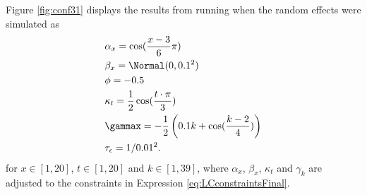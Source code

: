 Figure \ref{fig:conf31} displays the results from running \inlabru when the random effects were simulated as
\begin{equation}
    \begin{aligned}
        &\alpha_x = \cos(\frac{x-3}{6}\pi)\\
        &\beta_x = \Normal(0,0.1^2)\\
        &\phi = -0.5\\
        &\kappa_t = \frac{1}{2}\cos(\frac{t\cdot \pi}{3})\\
        &\gammax = -\frac{1}{2}\left( 0.1k + \cos(\frac{k-2}{4})\right)\\
        &\tau_{\epsilon} = 1/0.01^2.
    \end{aligned}
    \label{eq:conf31}
\end{equation}
for $x\in[1,20]$, $t \in [1,20]$ and $k \in [1,39]$, where $\alpha_x$, $\beta_x$, $\kappa_t$ and $\gamma_k$ are adjusted to the constraints in Expression \ref{eq:LCconstraintsFinal}. 

